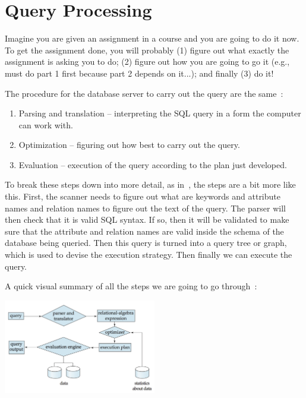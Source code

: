 




\section*{Query Processing}

Imagine you are given an assignment in a course and you are going to do it now. To get the assignment done, you will probably (1) figure out what exactly the assignment is asking you to do; (2) figure out how you are going to go it (e.g., must do part 1 first because part 2 depends on it...); and finally (3) do it! 

The procedure for the database server to carry out the query are the same~\cite{dsc}:

\begin{enumerate}
	\item Parsing and translation -- interpreting the SQL query in a form the computer can work with.
	\item Optimization -- figuring out how best to carry out the query.
	\item Evaluation -- execution of the query according to the plan just developed.
\end{enumerate}

To break these steps down into more detail, as in~\cite{fds}, the steps are a bit more like this. First, the scanner needs to figure out what are keywords and attribute names and relation names to figure out the text of the query. The parser will then check that it is valid SQL syntax. If so, then it will be validated to make sure that the attribute and relation names are valid inside the schema of the database being queried. Then this query is turned into a query tree or graph, which is used to devise the execution strategy. Then finally we can execute the query.

A quick visual summary of all the steps we are going to go through~\cite{dsc}:
\begin{center}
	\includegraphics[width=0.5\textwidth]{images/query-processing-overview}
\end{center}

